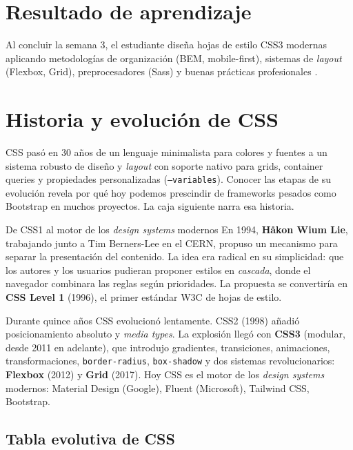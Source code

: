 \documentclass[11pt,a4paper,openany]{book}
\begin{document}
\section*{Resultado de aprendizaje}
Al concluir la semana 3, el estudiante diseña hojas de estilo CSS3
modernas aplicando metodologías de organización (BEM, mobile-first),
sistemas de \emph{layout} (Flexbox, Grid), preprocesadores (Sass) y
buenas prácticas profesionales \cite{macdonald2018css,frain2020responsive}.

\section{Historia y evolución de CSS}

CSS pasó en 30 años de un lenguaje minimalista para colores y
fuentes a un sistema robusto de diseño y \emph{layout} con soporte
nativo para grids, container queries y propiedades personalizadas
(\texttt{--variables}). Conocer las etapas de su evolución revela
por qué hoy podemos prescindir de frameworks pesados como Bootstrap
en muchos proyectos. La caja siguiente narra esa historia.


\begin{cajahistoria}{De CSS1 al motor de los \emph{design systems} modernos}
En 1994, \textbf{Håkon Wium Lie}, trabajando junto a Tim Berners-Lee
en el CERN, propuso un mecanismo para separar la presentación del
contenido. La idea era radical en su simplicidad: que los autores y
los usuarios pudieran proponer estilos en \emph{cascada}, donde el
navegador combinara las reglas según prioridades. La propuesta se
convertiría en \textbf{CSS Level 1} (1996), el primer estándar W3C de
hojas de estilo.

Durante quince años CSS evolucionó lentamente. CSS2 (1998) añadió
posicionamiento absoluto y \emph{media types}. La explosión llegó con
\textbf{CSS3} (modular, desde 2011 en adelante), que introdujo
gradientes, transiciones, animaciones, transformaciones,
\texttt{border-radius}, \texttt{box-shadow} y dos sistemas
revolucionarios: \textbf{Flexbox} (2012) y \textbf{Grid} (2017). Hoy
CSS es el motor de los \emph{design systems} modernos: Material
Design (Google), Fluent (Microsoft), Tailwind CSS, Bootstrap.
\end{cajahistoria}

\subsection{Tabla evolutiva de CSS}
\end{document}
